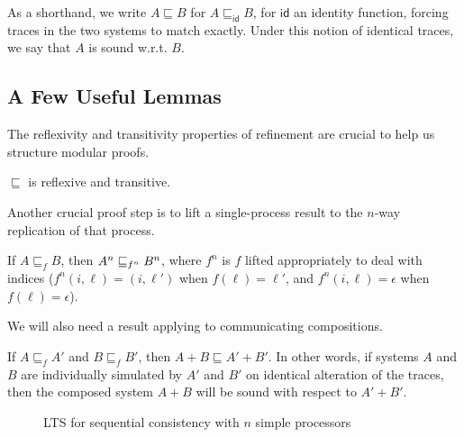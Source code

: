 As a shorthand, we write $A \sqsubseteq B$ for $A \sqsubseteq_\mathsf{id} B$,
for $\mathsf{id}$ an identity function, forcing traces in the two systems to
match exactly. Under this notion of identical traces, we say that $A$
is sound w.r.t. $B$.

\subsection{A Few Useful Lemmas}

The reflexivity and transitivity properties of refinement are crucial to help us
structure modular proofs.

\begin{theorem}\label{transitive}
$\sqsubseteq$ is reflexive and transitive.
\end{theorem}

Another crucial proof step is to lift a single-process result to the $n$-way
replication of that process.

\begin{theorem}\label{liftn}
If $A \sqsubseteq_f B$, then $\smulti{n}{A} \sqsubseteq_{f^n} \smulti{n}{B}$, where
$f^n$ is $f$ lifted appropriately to deal with indices ($f^n(i, \ell) =
(i, \ell')$ when $f(\ell) = \ell'$, and $f^n(i, \ell) = \epsilon$ when
$f(\ell) = \epsilon$).
\end{theorem}

We will also need a result applying to communicating compositions.

\begin{theorem}\label{liftplus}
If $A \sqsubseteq_f A'$ and $B \sqsubseteq_f B'$, then $A + B \sqsubseteq A' +
B'$. In other words, if systems $A$ and $B$ are individually simulated by $A'$ and
$B'$ on identical alteration of the traces, then the composed
system $A+B$ will be sound with respect to $A'+B'$.
\end{theorem}

\begin{figure}
\centering
\begin{boxedminipage}[c]{.48\textwidth}
{}
{}

{}

{}

{}
\end{boxedminipage}
\caption{LTS for sequential consistency with $n$ simple processors}
\label{Ref}
\end{figure}

